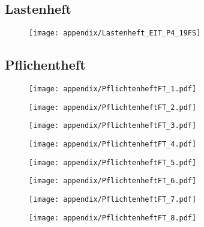 \begin{appendix}
\clearpage
\subsection{Lastenheft}
\label{app:Lastenheft}
\begin{figure}[h!]
	\centering
	\texttt{[image: appendix/Lastenheft\_EIT\_P4\_19FS]}
\end{figure}
%

\clearpage


\subsection{Pflichentheft}
\label{app:Pflichtenheft}
\begin{figure}[h]
	\centering
	\texttt{[image: appendix/PflichtenheftFT\_1.pdf]}
\end{figure}
\begin{figure}[h]
	\centering
	\texttt{[image: appendix/PflichtenheftFT\_2.pdf]}
\end{figure}
\begin{figure}[h]
	\centering
	\texttt{[image: appendix/PflichtenheftFT\_3.pdf]}
\end{figure}
\begin{figure}[h]
	\centering
	\texttt{[image: appendix/PflichtenheftFT\_4.pdf]}
\end{figure}
\begin{figure}[h]
	\centering
	\texttt{[image: appendix/PflichtenheftFT\_5.pdf]}
\end{figure}
\begin{figure}[h]
	\centering
	\texttt{[image: appendix/PflichtenheftFT\_6.pdf]}
\end{figure}
\begin{figure}[h]
	\centering
	\texttt{[image: appendix/PflichtenheftFT\_7.pdf]}
\end{figure}
\begin{figure}[h]
	\centering
	\texttt{[image: appendix/PflichtenheftFT\_8.pdf]}
\end{figure}
\begin{figure}[h]

\end{figure}
\end{appendix}
